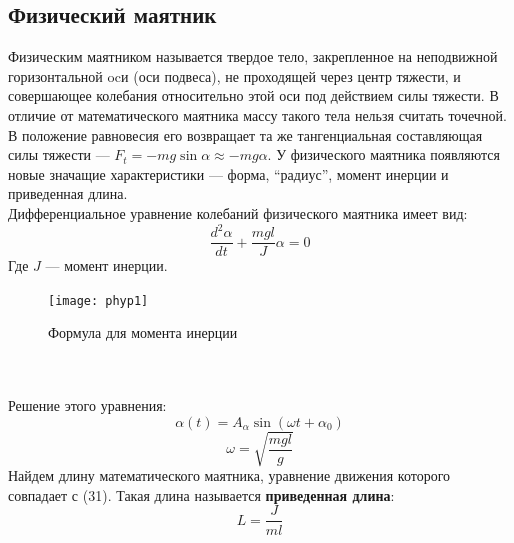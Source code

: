 \subsection*{Физический маятник}
Физическим маятником называется твердое тело, закрепленное на неподвижной горизонтальной ocи (оси подвеса), не проходящей через центр тяжести, и совершающее колебания относительно этой оси под действием силы тяжести. В отличие от математического маятника массу такого тела нельзя считать точечной. В положение равновесия его возвращает та же тангенциальная составляющая силы тяжести --- $F_t = -mg\sin\alpha \approx -mg\alpha $. У физического маятника появляются новые значащие характеристики --- форма, ``радиус'', момент инерции и приведенная длина.\\
Дифференциальное уравнение колебаний физического маятника имеет вид:
\begin{equation}
\frac{d^2\alpha}{dt} + \frac{mgl}{J}\alpha = 0
\end{equation}
Где $J$ --- момент инерции.
\begin{figure}[h!]
	\centering
	\texttt{[image: phyp1]}\\
	\caption{Формула для момента инерции}
\end{figure} \\ \\
Решение этого уравнения:
\begin{equation}
\alpha(t) = A_\alpha\sin(\omega t + \alpha_0)
\end{equation}
\begin{equation}
\omega = \sqrt {\frac{mgl}{g}}
\end{equation}
Найдем длину математического маятника, уравнение движения которого совпадает с (31). Такая длина называется \textbf{приведенная длина}:
\begin{equation}
L = \frac{J}{ml}
\end{equation}
